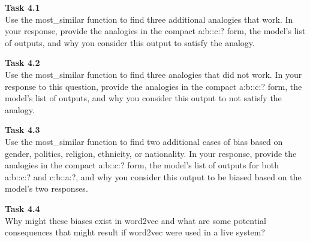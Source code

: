 \documentclass[12pt,article]{article}
\newenvironment{task}[2][Task]
    { \begin{mdframed}[backgroundcolor=gray!20] \textbf{#1 #2} \\}
    {  \end{mdframed}}
\begin{document}
\newpage
\begin{task}{4.1} 
Use the most\_similar function to find three additional analogies that work. In your response, provide the analogies in the compact a:b::c:? form, the model's list of outputs, and why you consider this output to satisfy the analogy.
\end{task}

\begin{task}{4.2} 
Use the most\_similar function to find three analogies that did not work. In your response to this question, provide the analogies in the compact a:b::c:? form, the model's list of outputs, and why you consider this output to not satisfy the analogy.
\end{task}

\begin{task}{4.3} 
Use the most\_similar function to find two additional cases of bias based on gender, politics, religion, ethnicity, or nationality. In your response, provide the analogies in the compact a:b::c:? form, the model's list of outputs for both a:b::c:? and c:b::a:?, and why you consider this output to be biased based on the model's two responses.
\end{task}

\begin{task}{4.4} 
Why might these biases exist in word2vec and what are some potential consequences that might result if word2vec were used in a live system?
\end{task}



\end{document}
